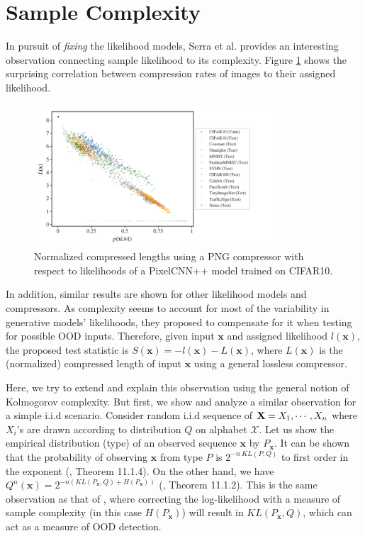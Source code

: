 \section{Sample Complexity}
In pursuit of \textit{fixing} the likelihood models, Serra et al. \cite{serra2019input} provides an interesting observation connecting sample likelihood to its complexity. Figure \ref{fig:4-6} shows the surprising correlation between compression rates of images to their assigned likelihood.

\begin{figure}[h]
    \centering
    \includegraphics[width=0.8\textwidth]{figures/ch4/complexity.png}
    \caption{\cite{serra2019input} Normalized compressed lengths using a PNG compressor with respect to likelihoods of a PixelCNN++ model trained on CIFAR10.}
    \label{fig:4-6}
\end{figure}

In addition, similar results are shown for other likelihood models and compressors. As complexity seems to account for most of the variability in generative models’ likelihoods, they proposed to compensate for it when testing for possible OOD inputs. Therefore, given input $\bm{x}$ and assigned likelihood $l(\bm{x})$, the proposed test statistic is $S(\bm{x})=-l(\bm{x})-L(\bm{x})$, where $L(\bm{x})$ is the (normalized) compressed length of input $\bm{x}$ using a general lossless compressor. 

Here, we try to extend and explain this observation using the general notion of Kolmogorov complexity. But first, we show and analyze a similar observation for a simple i.i.d scenario. Consider random i.i.d sequence of $\bold{X} = X_1, \cdots, X_n$ where $X_i$'s are drawn according to distribution $Q$ on alphabet $\mathcal{X}$. Let us show the empirical distribution (type) of an observed sequence $\bm{x}$ by $P_\bm{x}$. It can be shown that the probability of observing $\bm{x}$ from type $P$ is $2^{-n \ KL(P, Q)}$ to first order in the exponent (\cite{elements}, Theorem 11.1.4). On the other hand, we have $Q^n(\bm{x})=2^{ -n( KL(P_{\bm{x}},Q) + H( P_{\bm{x}} ) )}$ (\cite{elements}, Theorem 11.1.2). This is the same observation as that of \cite{serra2019input}, where correcting the log-likelihood with a measure of sample complexity (in this case $H( P_{\bm{x}} )$) will result in $KL(P_{\bm{x}}, Q)$, which can act as a measure of OOD detection.

